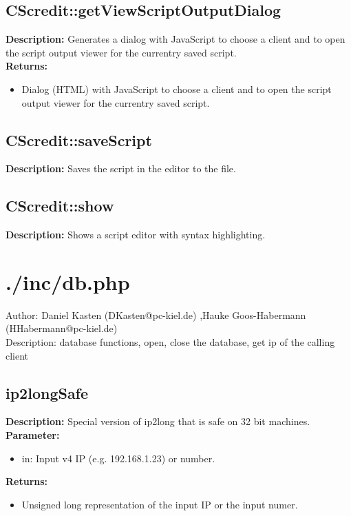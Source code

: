 \subsection{CScredit::getViewScriptOutputDialog}
\textbf{Description:} Generates a dialog with JavaScript to choose a client and to open the script output viewer for the currentry saved script.\\
\textbf{Returns:}
\begin{itemize}
\item Dialog (HTML) with JavaScript to choose a client and to open the script output viewer for the currentry saved script.
\end{itemize}

\subsection{CScredit::saveScript}
\textbf{Description:} Saves the script in the editor to the file.\\

\subsection{CScredit::show}
\textbf{Description:} Shows a script editor with syntax highlighting.\\

\newpage\section{./inc/db.php}
 Author: Daniel Kasten (DKasten@pc-kiel.de) ,Hauke Goos-Habermann (HHabermann@pc-kiel.de)\\
 Description: database functions, open, close the database, get ip of the calling client\\

\subsection{ip2longSafe}
\textbf{Description:} Special version of ip2long that is safe on 32 bit machines.\\
\textbf{Parameter:}
\begin{itemize}
\item in: Input v4 IP (e.g. 192.168.1.23) or number.
\end{itemize}
\textbf{Returns:}
\begin{itemize}
\item Unsigned long representation of the input IP or the input numer.
\end{itemize}

